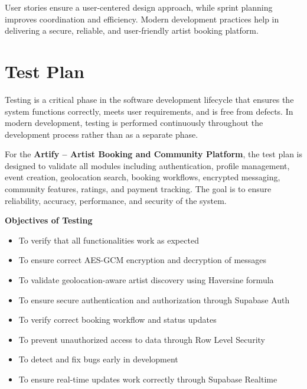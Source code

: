 \documentclass[12pt,a4paper]{report}
\begin{document}
User stories ensure a user-centered design approach, while sprint planning improves coordination and efficiency. Modern development practices help in delivering a secure, reliable, and user-friendly artist booking platform.

\setcounter{chapter}{6}
\clearpage
\thispagestyle{empty}

\noindent
{}

\clearpage
{}
\setcounter{section}{0}
\section{Test Plan}

Testing is a critical phase in the software development lifecycle that ensures the system functions correctly, meets user requirements, and is free from defects. In modern development, testing is performed continuously throughout the development process rather than as a separate phase.

For the \textbf{Artify -- Artist Booking and Community Platform}, the test plan is designed to validate all modules including authentication, profile management, event creation, geolocation search, booking workflows, encrypted messaging, community features, ratings, and payment tracking. The goal is to ensure reliability, accuracy, performance, and security of the system.

\textbf{Objectives of Testing}

\begin{itemize}
\item To verify that all functionalities work as expected
\item To ensure correct AES-GCM encryption and decryption of messages
\item To validate geolocation-aware artist discovery using Haversine formula
\item To ensure secure authentication and authorization through Supabase Auth
\item To verify correct booking workflow and status updates
\item To prevent unauthorized access to data through Row Level Security
\item To detect and fix bugs early in development
\item To ensure real-time updates work correctly through Supabase Realtime
\end{itemize}
\end{document}
